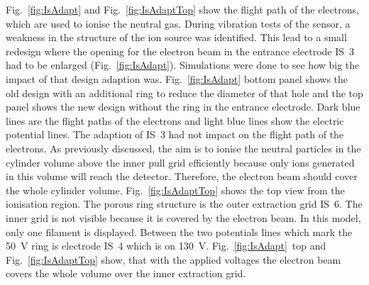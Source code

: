 	Fig.~\ref{fig:IsAdapt} and Fig.~\ref{fig:IsAdaptTop} show the flight path of the electrons, which are used to ionise the neutral gas. During vibration tests of the sensor, a weakness in the structure of the ion source was identified. This lead to a small redesign where the opening for the electron beam in the entrance electrode IS~3 had to be enlarged (Fig.~\ref{fig:IsAdapt}). Simulations were done to see how big the impact of that design adaption was. Fig.~\ref{fig:IsAdapt} bottom panel shows the old design with an additional ring to reduce the diameter of that hole and the top panel shows the new design without the ring in the entrance electrode. Dark blue lines are the flight paths of the electrons and light blue lines show the electric potential lines. The adaption of IS~3 had not impact on the flight path of the electrons. As previously discussed, the aim is to ionise the neutral particles in the cylinder volume above the inner pull grid efficiently because only ions generated in this volume will reach the detector. Therefore, the electron beam should cover the whole cylinder volume. Fig.~\ref{fig:IsAdaptTop} shows the top view from the ionisation region. The porous ring structure is the outer extraction grid IS~6. The inner grid is not visible because it is covered by the electron beam. In this model, only one filament is displayed. Between the two potentials lines which mark the 50~V ring is electrode IS~4 which is on 130~V. Fig.~\ref{fig:IsAdapt}~top and Fig.~\ref{fig:IsAdaptTop} show, that with the applied voltages the electron beam covers the whole volume over the inner extraction grid.
	\newpage
	
	

